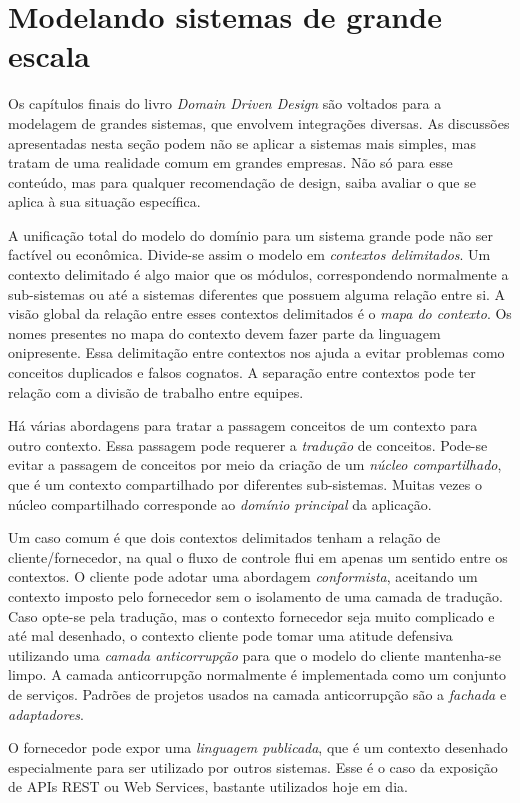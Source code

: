 \documentclass[a4paper, 12pt]{article}
\newcommand{\ddd}{\emph{Domain Driven Design}\xspace}
\begin{document}
\section{Modelando sistemas de grande escala}

Os capítulos finais do livro \ddd são voltados para a modelagem de grandes sistemas, que envolvem integrações diversas. As discussões apresentadas nesta seção podem não se aplicar a sistemas mais simples, mas tratam de uma realidade comum em grandes empresas. Não só para esse conteúdo, mas para qualquer recomendação de design, saiba avaliar o que se aplica à sua situação específica.

A unificação total do modelo do domínio para um sistema grande pode não ser factível ou econômica. Divide-se assim o modelo em \emph{contextos delimitados}. Um contexto delimitado é algo maior que os módulos, correspondendo normalmente a sub-sistemas ou até a sistemas diferentes que possuem alguma relação entre si. A visão global da relação entre esses contextos delimitados é o \emph{mapa do contexto}. Os nomes presentes no mapa do contexto devem fazer parte da linguagem onipresente. Essa delimitação entre contextos nos ajuda a evitar problemas como conceitos duplicados e falsos cognatos. A separação entre contextos pode ter relação com a divisão de trabalho entre equipes. 

Há várias abordagens para tratar a passagem conceitos de um contexto para outro contexto. Essa passagem pode requerer a \emph{tradução} de conceitos. Pode-se evitar a passagem de conceitos por meio da criação de um \emph{núcleo compartilhado}, que é um contexto compartilhado por diferentes sub-sistemas. Muitas vezes o núcleo compartilhado corresponde ao \emph{domínio principal} da aplicação.

Um caso comum é que dois contextos delimitados tenham a relação de cliente/fornecedor, na qual o fluxo de controle flui em apenas um sentido entre os contextos. O cliente pode adotar uma abordagem \emph{conformista}, aceitando um contexto imposto pelo fornecedor sem o isolamento de uma camada de tradução. Caso opte-se pela tradução, mas o contexto fornecedor seja muito complicado e até mal desenhado, o contexto cliente pode tomar uma atitude defensiva utilizando uma \emph{camada anticorrupção} para que o modelo do cliente mantenha-se limpo. A camada anticorrupção normalmente é implementada como um conjunto de serviços. Padrões de projetos usados na camada anticorrupção são a \emph{fachada} e \emph{adaptadores}. 

O fornecedor pode expor uma \emph{linguagem publicada}, que é um contexto desenhado especialmente para ser utilizado por outros sistemas. Esse é o caso da exposição de APIs REST ou Web Services, bastante utilizados hoje em dia.
\end{document}
